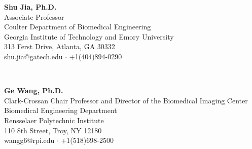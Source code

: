 \documentclass[letterpaper, 11pt]{article}
\newcommand{\subsectionvspace}{\vspace{8pt}}
\begin{document}
    \subsectionvspace

    \begin{minipage}[t]{0.48\textwidth} 
        \textbf{Shu Jia, Ph.D.} \\
        Associate Professor \\
        Coulter Department of Biomedical Engineering \\
        Georgia Institute of Technology and Emory University \\
        313 Ferst Drive, Atlanta, GA 30332 \\
        shu.jia@gatech.edu $\cdot$ +1(404)894-0290
    \end{minipage}%
    \begin{minipage}[t]{0.04\textwidth}
        \
    \end{minipage}%
    \begin{minipage}[t]{0.48\textwidth}
        \textbf{Ge Wang, Ph.D.} \\
        Clark-Crossan Chair Professor and Director of the Biomedical Imaging Center \\
        Biomedical Engineering Department \\
        Rensselaer Polytechnic Institute \\
        110 8th Street, Troy, NY 12180 \\
        wangg6@rpi.edu $\cdot$ +1(518)698-2500
    \end{minipage}
\end{document}
